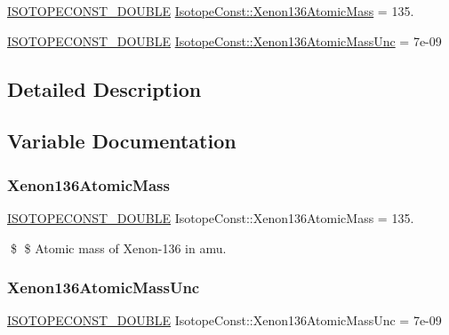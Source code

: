 \begin{DoxyCompactItemize}
\item 
\mbox{\hyperlink{group___isotope_const-_macros_ga8f45a7272ce02c0b4c65c44636ed719a}{I\+S\+O\+T\+O\+P\+E\+C\+O\+N\+S\+T\+\_\+\+D\+O\+U\+B\+LE}} \mbox{\hyperlink{group___isotope_const-_xenon-_xe136_gacbc57940d1998b978e67419f7e36934e}{Isotope\+Const\+::\+Xenon136\+Atomic\+Mass}} = 135.
\item 
\mbox{\hyperlink{group___isotope_const-_macros_ga8f45a7272ce02c0b4c65c44636ed719a}{I\+S\+O\+T\+O\+P\+E\+C\+O\+N\+S\+T\+\_\+\+D\+O\+U\+B\+LE}} \mbox{\hyperlink{group___isotope_const-_xenon-_xe136_ga2d77a757bedf218213fd9f6aea8d982d}{Isotope\+Const\+::\+Xenon136\+Atomic\+Mass\+Unc}} = 7e-\/09
\end{DoxyCompactItemize}


\subsection{Detailed Description}


\subsection{Variable Documentation}
\mbox{\label{group___isotope_const-_xenon-_xe136_gacbc57940d1998b978e67419f7e36934e}} 
\subsubsection{\texorpdfstring{Xenon136\+Atomic\+Mass}{Xenon136AtomicMass}}
{\footnotesize\ttfamily \mbox{\hyperlink{group___isotope_const-_macros_ga8f45a7272ce02c0b4c65c44636ed719a}{I\+S\+O\+T\+O\+P\+E\+C\+O\+N\+S\+T\+\_\+\+D\+O\+U\+B\+LE}} Isotope\+Const\+::\+Xenon136\+Atomic\+Mass = 135.}

\$ \$ Atomic mass of Xenon-\/136 in amu. \mbox{\label{group___isotope_const-_xenon-_xe136_ga2d77a757bedf218213fd9f6aea8d982d}} 
\subsubsection{\texorpdfstring{Xenon136\+Atomic\+Mass\+Unc}{Xenon136AtomicMassUnc}}
{\footnotesize\ttfamily \mbox{\hyperlink{group___isotope_const-_macros_ga8f45a7272ce02c0b4c65c44636ed719a}{I\+S\+O\+T\+O\+P\+E\+C\+O\+N\+S\+T\+\_\+\+D\+O\+U\+B\+LE}} Isotope\+Const\+::\+Xenon136\+Atomic\+Mass\+Unc = 7e-\/09}

